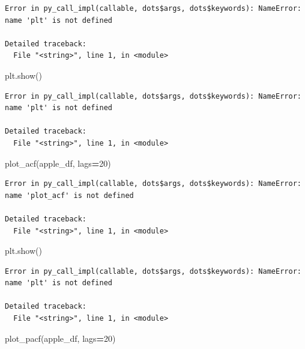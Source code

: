 \documentclass[]{book}
\newenvironment{Shaded}{\begin{snugshade}}{\end{snugshade}}
\newcommand{\DecValTok}[1]{\textcolor[rgb]{0.00,0.00,0.81}{#1}}
\newcommand{\NormalTok}[1]{#1}
\newcommand{\OperatorTok}[1]{\textcolor[rgb]{0.81,0.36,0.00}{\textbf{#1}}}
\begin{document}
\begin{verbatim}
Error in py_call_impl(callable, dots$args, dots$keywords): NameError: name 'plt' is not defined

Detailed traceback: 
  File "<string>", line 1, in <module>
\end{verbatim}

\begin{Shaded}
\begin{Highlighting}[]
\NormalTok{plt.show()}
\end{Highlighting}
\end{Shaded}

\begin{verbatim}
Error in py_call_impl(callable, dots$args, dots$keywords): NameError: name 'plt' is not defined

Detailed traceback: 
  File "<string>", line 1, in <module>
\end{verbatim}

\begin{Shaded}
\begin{Highlighting}[]
\NormalTok{plot_acf(apple_df, lags}\OperatorTok{=}\DecValTok{20}\NormalTok{)}
\end{Highlighting}
\end{Shaded}

\begin{verbatim}
Error in py_call_impl(callable, dots$args, dots$keywords): NameError: name 'plot_acf' is not defined

Detailed traceback: 
  File "<string>", line 1, in <module>
\end{verbatim}

\begin{Shaded}
\begin{Highlighting}[]
\NormalTok{plt.show()}
\end{Highlighting}
\end{Shaded}

\begin{verbatim}
Error in py_call_impl(callable, dots$args, dots$keywords): NameError: name 'plt' is not defined

Detailed traceback: 
  File "<string>", line 1, in <module>
\end{verbatim}

\begin{Shaded}
\begin{Highlighting}[]
\NormalTok{plot_pacf(apple_df, lags}\OperatorTok{=}\DecValTok{20}\NormalTok{)}
\end{Highlighting}
\end{Shaded}
\end{document}
